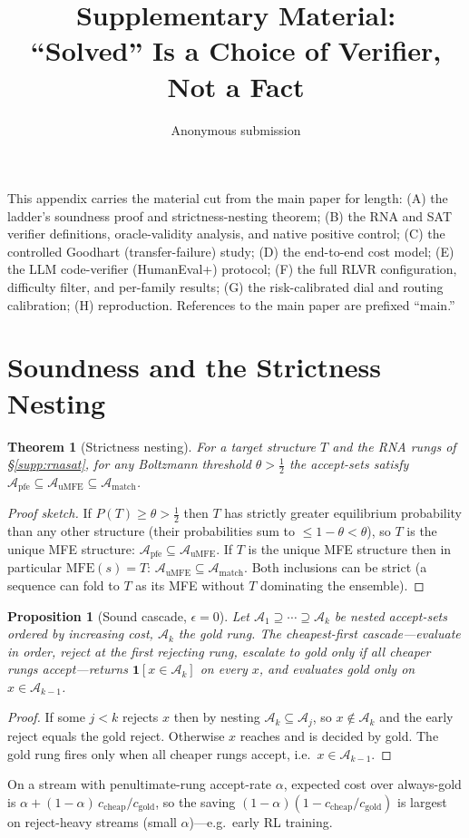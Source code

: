 \documentclass[letterpaper]{article} %
\title{Supplementary Material:\\
``Solved'' Is a Choice of Verifier, Not a Fact}
\author{Anonymous submission}
\newtheorem{proposition}{Proposition}
\newtheorem{theorem}{Theorem}
\newcommand{\match}{\ensuremath{\mathcal{A}_{\mathrm{match}}}}
\newcommand{\umfe}{\ensuremath{\mathcal{A}_{\mathrm{uMFE}}}}
\newcommand{\pfe}{\ensuremath{\mathcal{A}_{\mathrm{pfe}}}}
\newcommand{\PT}{\ensuremath{P(T)}}
\begin{document}
\maketitle

\noindent This appendix carries the material cut from the main paper for length: (A) the ladder's soundness
proof and strictness-nesting theorem; (B) the RNA and SAT verifier definitions, oracle-validity analysis, and
native positive control; (C) the controlled Goodhart (transfer-failure) study; (D) the end-to-end cost model;
(E) the LLM code-verifier (HumanEval+) protocol; (F) the full RLVR configuration, difficulty filter, and
per-family results; (G) the risk-calibrated dial and routing calibration; (H) reproduction. References to the
main paper are prefixed ``main.''

\section{Soundness and the Strictness Nesting}\label{supp:proof}
\begin{theorem}[Strictness nesting]\label{thm:nest}
For a target structure $T$ and the RNA rungs of \S\ref{supp:rnasat}, for any Boltzmann threshold
$\theta>\tfrac12$ the accept-sets satisfy $\pfe\subseteq\umfe\subseteq\match$.
\end{theorem}
\begin{proof}[Proof sketch]
If $\PT\ge\theta>\tfrac12$ then $T$ has strictly greater equilibrium probability than any other structure
(their probabilities sum to $\le1-\theta<\theta$), so $T$ is the unique MFE structure: $\pfe\subseteq\umfe$.
If $T$ is the unique MFE structure then in particular $\mathrm{MFE}(s)=T$: $\umfe\subseteq\match$. Both
inclusions can be strict (a sequence can fold to $T$ as its MFE without $T$ dominating the ensemble). \end{proof}

\begin{proposition}[Sound cascade, $\epsilon{=}0$]\label{prop:cascade}
Let $\mathcal{A}_1\supseteq\cdots\supseteq\mathcal{A}_k$ be nested accept-sets ordered by increasing cost,
$\mathcal{A}_k$ the gold rung. The cheapest-first cascade---evaluate in order, reject at the first rejecting
rung, escalate to gold only if all cheaper rungs accept---returns $\mathbf{1}[x\in\mathcal{A}_k]$ on every
$x$, and evaluates gold only on $x\in\mathcal{A}_{k-1}$.
\end{proposition}
\begin{proof}
If some $j<k$ rejects $x$ then by nesting $\mathcal{A}_k\subseteq\mathcal{A}_j$, so $x\notin\mathcal{A}_k$ and
the early reject equals the gold reject. Otherwise $x$ reaches and is decided by gold. The gold rung fires
only when all cheaper rungs accept, i.e.\ $x\in\mathcal{A}_{k-1}$. \end{proof}
On a stream with penultimate-rung accept-rate $\alpha$, expected cost over always-gold is
$\alpha + (1-\alpha)\,c_{\mathrm{cheap}}/c_{\mathrm{gold}}$, so the saving $(1-\alpha)(1-c_{\mathrm{cheap}}/
c_{\mathrm{gold}})$ is largest on reject-heavy streams (small $\alpha$)---e.g.\ early RL training.
\end{document}

